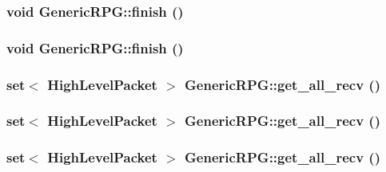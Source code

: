 \hypertarget{classGenericRPG_03ec120747d2935217291fe23f4c36dd}{
\subsubsection[{finish}]{\setlength{\rightskip}{0pt plus 5cm}void GenericRPG::finish ()}}
\label{classGenericRPG_03ec120747d2935217291fe23f4c36dd}


\hypertarget{classGenericRPG_03ec120747d2935217291fe23f4c36dd}{
\subsubsection[{finish}]{\setlength{\rightskip}{0pt plus 5cm}void GenericRPG::finish ()}}
\label{classGenericRPG_03ec120747d2935217291fe23f4c36dd}


\hypertarget{classGenericRPG_e6ad83dd5abf9673db6f8bd713979392}{
\subsubsection[{get\_\-all\_\-recv}]{\setlength{\rightskip}{0pt plus 5cm}set$<$ {\bf HighLevelPacket} $>$ GenericRPG::get\_\-all\_\-recv ()}}
\label{classGenericRPG_e6ad83dd5abf9673db6f8bd713979392}


\hypertarget{classGenericRPG_e6ad83dd5abf9673db6f8bd713979392}{
\subsubsection[{get\_\-all\_\-recv}]{\setlength{\rightskip}{0pt plus 5cm}set$<$ {\bf HighLevelPacket} $>$ GenericRPG::get\_\-all\_\-recv ()}}
\label{classGenericRPG_e6ad83dd5abf9673db6f8bd713979392}


\hypertarget{classGenericRPG_e6ad83dd5abf9673db6f8bd713979392}{
\subsubsection[{get\_\-all\_\-recv}]{\setlength{\rightskip}{0pt plus 5cm}set$<$ {\bf HighLevelPacket} $>$ GenericRPG::get\_\-all\_\-recv ()}}
\label{classGenericRPG_e6ad83dd5abf9673db6f8bd713979392}


